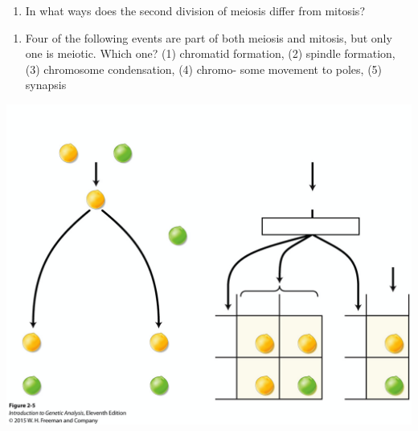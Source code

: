 \documentclass[11pt,]{article}
\providecommand{\tightlist}{%
  \setlength{\itemsep}{0pt}\setlength{\parskip}{0pt}}
\begin{document}
\begin{blackbox}

\begin{enumerate}
\def\labelenumi{\arabic{enumi}.}
\setcounter{enumi}{21}
\tightlist
\item
  In what ways does the second division of meiosis differ from mitosis?
\end{enumerate}

\vspace{19cm}

\end{blackbox}

\begin{blackbox}

\begin{enumerate}
\def\labelenumi{\arabic{enumi}.}
\setcounter{enumi}{29}
\tightlist
\item
  Four of the following events are part of both meiosis and mitosis, but
  only one is meiotic. Which one? (1) chromatid formation, (2) spindle
  formation, (3) chromosome condensation, (4) chromo- some movement to
  poles, (5) synapsis
\end{enumerate}

\vspace{19cm}

\end{blackbox}

\begin{landscape}

\begin{center}\includegraphics[width=0.9\linewidth,]{input/mendel-ratio} \end{center}

\end{landscape}
\end{document}
